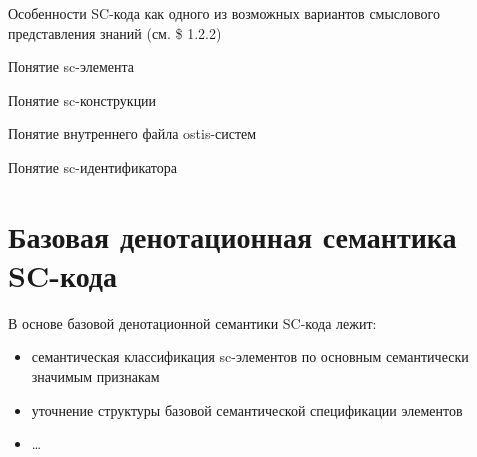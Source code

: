 Особенности SC-кода как одного из возможных
вариантов смыслового представления знаний 
(см. \$ 1.2.2) 

Понятие sc-элемента 

Понятие sc-конструкции 

Понятие внутреннего файла ostis-систем 

Понятие sc-идентификатора

\section{Базовая денотационная семантика SC-кода}
\label{sec_sr_scdsemantics}
В основе базовой денотационной семантики
SC-кода лежит:
\begin{itemize} 
\item семантическая классификация sc-элементов по
основным семантически значимым признакам 
\item уточнение структуры базовой семантической
спецификации элементов
\item …
\end{itemize}

\scnstartstruct


